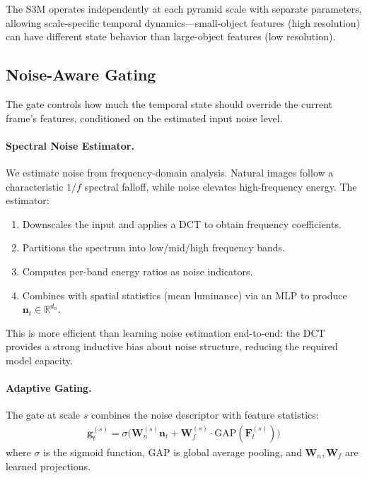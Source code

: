 \documentclass[review]{eccv2026}
\newcommand{\R}{\mathbb{R}}
\begin{document}
The S3M operates independently at each pyramid scale with separate parameters, allowing scale-specific temporal dynamics---small-object features (high resolution) can have different state behavior than large-object features (low resolution).

\subsection{Noise-Aware Gating}
\label{sec:noise_gate}

The gate controls how much the temporal state should override the current frame's features, conditioned on the estimated input noise level.

\paragraph{Spectral Noise Estimator.}
We estimate noise from frequency-domain analysis.
Natural images follow a characteristic $1/f$ spectral falloff, while noise elevates high-frequency energy.
The estimator:
\begin{enumerate}[leftmargin=1.5em,topsep=2pt,itemsep=1pt]
  \item Downscales the input and applies a DCT to obtain frequency coefficients.
  \item Partitions the spectrum into low/mid/high frequency bands.
  \item Computes per-band energy ratios as noise indicators.
  \item Combines with spatial statistics (mean luminance) via an MLP to produce $\bm{n}_t \in \R^{d_n}$.
\end{enumerate}

This is more efficient than learning noise estimation end-to-end: the DCT provides a strong inductive bias about noise structure, reducing the required model capacity.

\paragraph{Adaptive Gating.}
The gate at scale $s$ combines the noise descriptor with feature statistics:
\begin{align}
  \bm{g}_t^{(s)} = \sigma\bigl(\bm{W}_n^{(s)}\bm{n}_t + \bm{W}_f^{(s)} \cdot \text{GAP}(\bm{F}_t^{(s)})\bigr) \label{eq:gate_compute}
\end{align}
where $\sigma$ is the sigmoid function, $\text{GAP}$ is global average pooling, and $\bm{W}_n, \bm{W}_f$ are learned projections.
\end{document}
